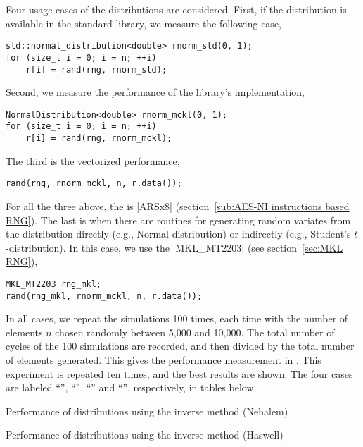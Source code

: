 Four usage cases of the distributions are considered. First, if the
distribution is available in the standard library, we measure the following
case,
\begin{verbatim}
std::normal_distribution<double> rnorm_std(0, 1);
for (size_t i = 0; i = n; ++i)
    r[i] = rand(rng, rnorm_std);
\end{verbatim}
Second, we measure the performance of the library's implementation,
\begin{verbatim}
NormalDistribution<double> rnorm_mckl(0, 1);
for (size_t i = 0; i = n; ++i)
    r[i] = rand(rng, rnorm_mckl);
\end{verbatim}
The third is the vectorized performance,
\begin{verbatim}
rand(rng, rnorm_mckl, n, r.data());
\end{verbatim}
For all the three above, the \rng is |ARSx8| (section~\ref{sub:AES-NI
instructions based RNG}). The last is when there are \mkl routines for
generating random variates from the distribution directly (e.g., Normal
distribution) or indirectly (e.g., Student's $t$-distribution). In this case,
we use the \rng |MKL_MT2203| (see section~\ref{sec:MKL RNG}),
\begin{verbatim}
MKL_MT2203 rng_mkl;
rand(rng_mkl, rnorm_mckl, n, r.data());
\end{verbatim}
In all cases, we repeat the simulations 100 times, each time with the number of
elements $n$ chosen randomly between 5,000 and 10,000. The total number of
cycles of the 100 simulations are recorded, and then divided by the total
number of elements generated. This gives the performance measurement in \cpe.
This experiment is repeated ten times, and the best results are shown. The four
cases are labeled ``\std'', ``\mckl'', ``\batch'' and ``\mkl'', respectively,
in tables below.

\begin{table}
  \caption{Performance of distributions using the inverse method (Nehalem)}
  \label{tab:Performance of distributions using the inverse method (Nehalem)}
\end{table}

\begin{table}
  \caption{Performance of distributions using the inverse method (Haswell)}
  \label{tab:Performance of distributions using the inverse method (Haswell)}
\end{table}

